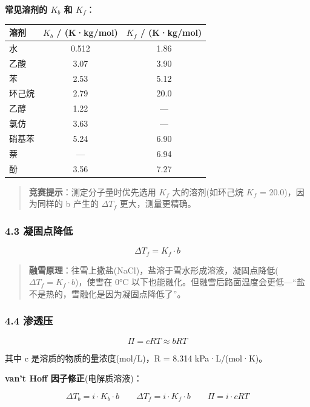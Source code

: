 \textbf{常见溶剂的 \(K_b\) 和 \(K_f\)}：

{\def\LTcaptype{none} %
\begin{longtable}[]{@{}lcc@{}}
\toprule\noalign{}
溶剂 & \(K_b\) / (K·kg/mol) & \(K_f\) / (K·kg/mol) \\
\midrule\noalign{}
\endhead
\bottomrule\noalign{}
\endlastfoot
水 & 0.512 & 1.86 \\
乙酸 & 3.07 & 3.90 \\
苯 & 2.53 & 5.12 \\
环己烷 & 2.79 & 20.0 \\
乙醇 & 1.22 & --- \\
氯仿 & 3.63 & --- \\
硝基苯 & 5.24 & 6.90 \\
萘 & --- & 6.94 \\
酚 & 3.56 & 7.27 \\
\end{longtable}
}

\begin{quote}
\textbf{竞赛提示}：测定分子量时优先选用 \(K_f\) 大的溶剂(如环己烷 \(K_f\) = 20.0)，因为同样的 b 产生的 \(\Delta T_f\) 更大，测量更精确。
\end{quote}

\subsubsection{4.3 凝固点降低}\label{ux51ddux56faux70b9ux964dux4f4e}

\[
\boxed{\Delta T_f = K_f \cdot b}
\]

\begin{quote}
\textbf{融雪原理}：往雪上撒盐(NaCl)，盐溶于雪水形成溶液，凝固点降低(\(\Delta T_f = K_f \cdot b\))，使雪在 0°C 以下也能融化。但融雪后路面温度会更低---``盐不是热的，雪融化是因为凝固点降低了''。
\end{quote}

\subsubsection{4.4 渗透压}\label{ux6e17ux900fux538b}

\[
\boxed{\Pi = cRT \approx bRT}
\]

其中 c 是溶质的物质的量浓度(mol/L)，R = 8.314 kPa·L/(mol·K)。

\textbf{van't Hoff 因子修正}(电解质溶液)：

\[
\Delta T_b = i \cdot K_b \cdot b \qquad \Delta T_f = i \cdot K_f \cdot b \qquad \Pi = i \cdot cRT
\]

